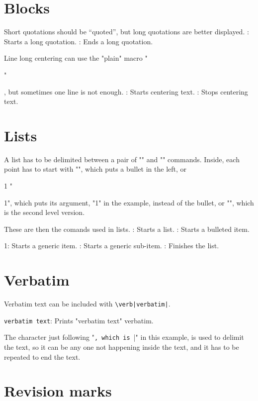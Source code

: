 \section{Blocks}

Short quotations should be “quoted”,
but long quotations are better displayed.
\command\begincitation: Starts a long quotation.
\command\endcitation: Ends a long quotation.

Line long centering can use the
"plain" macro "\centerline",
but sometimes one line is not enough.
\command\begincenter: Starts centering text.
\command\endcenter: Stops centering text.


\section{Lists}

A list has to be delimited between a pair of
"\beginpoints" and "\endpoints" commands.
Inside, each point has to start with
\beginpoints
\point "\point", which puts a bullet in the left, or
\item{1} "\item{1}", which puts its argument, "1" in the example,
instead of the bullet, or
 "", which is the second level
version.
\endpoints

These are then the comands used in lists.
\command\beginpoints: Starts a list.
\command\point: Starts a bulleted item.
\command\item{1}: Starts a generic item.
\command{}: Starts a generic sub-item.
\command\endpoints: Finishes the list.



\section{Verbatim}

Verbatim text can be included with \verb!\verb|verbatim|!.

\command\verb|verbatim text|: Prints "verbatim text" verbatim.

The character just following "\verb", which is "|" in this example,
is used to delimit the text, so it can be any one not happening
inside the text, and it has to be repeated to end the text.



\section{Revision marks}

